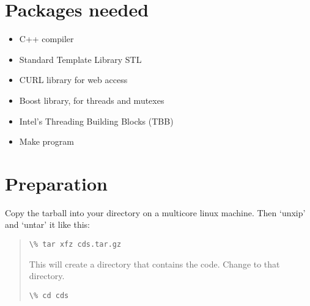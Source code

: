 \documentclass[letterpaper,10pt,openany,oneside]{sphinxmanual}
\begin{document}
\section{Packages needed}
\label{WebCrawler/CDS_crawler_lab_cpp:packages-needed}\begin{itemize}
\item {} 
C++ compiler

\item {} 
Standard Template Library STL

\item {} 
CURL library for web access

\item {} 
Boost library, for threads and mutexes

\item {} 
Intel's Threading Building Blocks (TBB)

\item {} 
Make program

\end{itemize}


\section{Preparation}
\label{WebCrawler/CDS_crawler_lab_cpp:preparation}
Copy the tarball into your directory on a multicore linux machine.  Then `unxip' and `untar' it like this:
\begin{quote}

\begin{Verbatim}[commandchars=\\\{\}]
\% tar xfz cds.tar.gz
\end{Verbatim}

This will create a directory  that contains the code. Change
to that directory.

\begin{Verbatim}[commandchars=\\\{\}]
\% cd cds
\end{Verbatim}
\end{quote}
\end{document}
